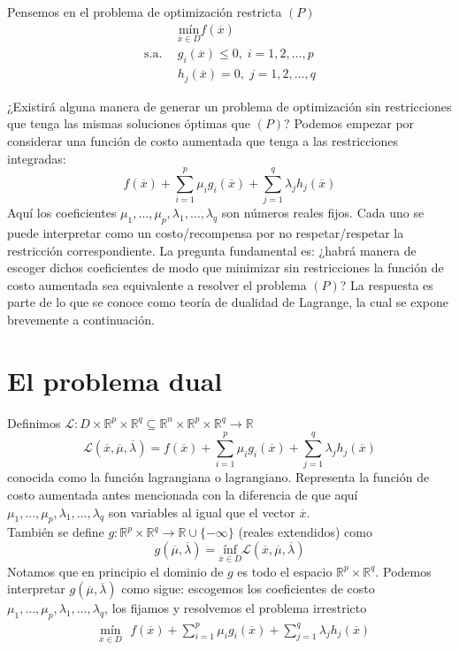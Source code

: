 \documentclass[11pt]{report}
\newcommand{\Rn}{\mathbb{R}^{n}}
\newcommand{\Rp}{\mathbb{R}^{p}}
\newcommand{\Rq}{\mathbb{R}^{q}}
\newcommand{\R}{\mathbb{R}}
\newcommand{\mv}{\overline{\mu}}
\newcommand{\lv}{\overline{\lambda}}
\newcommand{\x}{\overline{x}}
\newcommand{\Sp}{1,2,\ldots, p}
\newcommand{\Sq}{1,2,\ldots, q}
\newcommand{\La}{\mathcal{L}}
\begin{document}
Pensemos en el problema de optimización restricta $(P)$
\begin{equation*}
\begin{aligned}
& \underset{\x\in D}{\text{mín}} f(\x) \\
\text{s.a.}\ \
& g_i(\x) \leq 0, \; i = \Sp \\
& h_j(\x)=0, \; j=\Sq
\end{aligned}
\end{equation*}

\noindent
¿Existirá alguna manera de generar un problema de optimización sin restricciones que tenga las mismas soluciones óptimas que $(P)$? Podemos empezar por considerar una función de costo aumentada que tenga a las restricciones integradas:
$$f(\x)+\sum_{i=1}^{p}\mu_{i} g_{i}(\x) + \sum_{j=1}^{q}\lambda_{j} h_{j}(\x)$$
Aquí los coeficientes $\mu_{1},\ldots,\mu_{p}, \lambda_{1},\ldots,\lambda_{q}$ son números reales fijos. Cada uno se puede interpretar como un costo/recompensa por no respetar/respetar la restricción correspondiente. La pregunta fundamental es: ¿habrá manera de escoger dichos coeficientes de modo que minimizar sin restricciones la función de costo aumentada sea equivalente a resolver el problema $(P)$? La respuesta es parte de lo que se conoce como teoría de dualidad de Lagrange, la cual se expone brevemente a continuación.\\

\section{El problema dual}
Definimos $\La: D\times\Rp\times\Rq\subseteq\Rn\times\Rp\times\Rq\rightarrow\R$ $$\La(\x,\mv,\lv)=f(\x)+\sum_{i=1}^{p}\mu_{i} g_{i}(\x) + \sum_{j=1}^{q}\lambda_{j} h_{j}(\x)$$
conocida como la función lagrangiana o lagrangiano. Representa la función de costo aumentada antes mencionada con la diferencia de que aquí $\mu_{1},\ldots,\mu_{p}, \lambda_{1},\ldots,\lambda_{q}$ son variables al igual que el vector $\x$.\\

También se define $g:\Rp\times\Rq\rightarrow\R\cup\{-\infty\}$ (reales extendidos) como
$$g(\mv, \lv)= \underset{\x\in D}{\text{ínf}}\La(\x,\mv,\lv)$$
Notamos que en principio el dominio de $g$ es todo el espacio $\Rp\times\Rq$. Podemos interpretar $g(\mv,\lv)$ como sigue: escogemos los coeficientes de costo $\mu_{1},\ldots,\mu_{p}, \lambda_{1},\ldots,\lambda_{q}$, los fijamos y resolvemos el problema irrestricto
\begin{equation*}
\begin{aligned}
& \underset{\x\in D}{\text{mín}}\ \ \ f(\x)+\sum_{i=1}^{p}\mu_{i} g_{i}(\x) + \sum_{j=1}^{q}\lambda_{j} h_{j}(\x) \\
\end{aligned}
\end{equation*}\\
\end{document}
